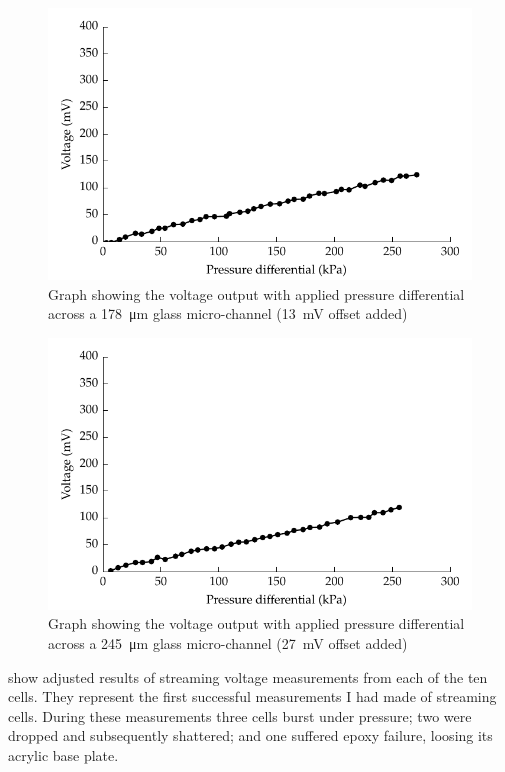 \begin{figure}
    \centering
    \includegraphics{content/pt1/01-PowerHarvesting/graphics/streamingCell_voltVsPress_178um_out}
    \caption{\label{fig:VvsP_178um}Graph showing the voltage output with applied pressure differential across a \SI{178}{\micro\metre} glass micro-channel (\SI{13}{\milli\volt} offset added)}
\end{figure}

\begin{figure}
    \centering
    \includegraphics{content/pt1/01-PowerHarvesting/graphics/streamingCell_voltVsPress_245um_out}
    \caption{\label{fig:VvsP_245um}Graph showing the voltage output with applied pressure differential across a \SI{245}{\micro\metre} glass micro-channel (\SI{27}{\milli\volt} offset added)}
\end{figure}

 show adjusted results of streaming voltage measurements from each of the ten cells.
They represent the first successful measurements I had made of streaming cells.
During these measurements three cells burst under pressure; two were dropped and subsequently shattered; and one suffered epoxy failure, loosing its acrylic base plate.

